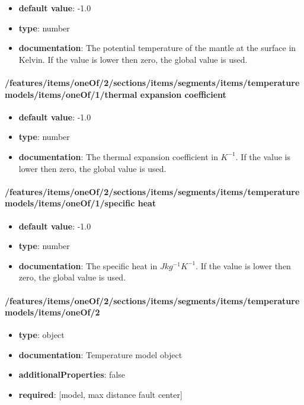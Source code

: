 \begin{itemize}\item {\bf default value}: -1.0
\item {\bf type}: number
\item {\bf documentation}: The potential temperature of the mantle at the surface in Kelvin. If the value is lower then zero, the global value is used.
\end{itemize}\paragraph{/features/items/oneOf/2/sections/items/segments/items/temperature models/items/oneOf/1/thermal expansion coefficient}
\begin{itemize}\item {\bf default value}: -1.0
\item {\bf type}: number
\item {\bf documentation}: The thermal expansion coefficient in $K^{-1}$. If the value is lower then zero, the global value is used.
\end{itemize}\paragraph{/features/items/oneOf/2/sections/items/segments/items/temperature models/items/oneOf/1/specific heat}
\begin{itemize}\item {\bf default value}: -1.0
\item {\bf type}: number
\item {\bf documentation}: The specific heat in $J kg^{-1} K^{-1}$. If the value is lower then zero, the global value is used.
\end{itemize}\paragraph{/features/items/oneOf/2/sections/items/segments/items/temperature models/items/oneOf/2}
\begin{itemize}\item {\bf type}: object
\item {\bf documentation}: Temperature model object
\item {\bf additionalProperties}: false
\item {\bf required}: [model, max distance fault center]\end{itemize}
